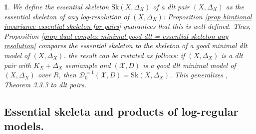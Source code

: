 \documentclass{amsart}%
\numberwithin{equation}{subsection}
\theoremstyle{plain2}
\theoremstyle{definition2}
\theoremstyle{stepstyle}
\theoremstyle{point}
\theoremstyle{subpoint}
\newtheorem{subpoint}[equation]{}%
\newcommand{\spa}[1]{\begin{subpoint}#1\end{subpoint}}           %
\newcommand{\cX}{\ensuremath{\mathscr{X}}}
\newcommand{\Sk}{\mathrm{Sk}}
\begin{document}
\spa{We define the essential skeleton $\Sk(X,\Delta_X)$ of a dlt pair $(X, \Delta_X)$ as the essential skeleton of any log-resolution of $(X,\Delta_X)$: Proposition \ref{prop birational invariance essential skeleton for pairs} guarantees that this is well-defined. Thus, Proposition \ref{prop dual complex minimal good dlt = essential skeleton any resolution} compares the essential skeleton to the skeleton of a good minimal dlt model of $(X,\Delta_X)$. the result can be restated as follows: if $(X,\Delta_X)$ is a dlt pair with $K_X+\Delta_X$ semiample and $(\cX,D)$ is a good dlt minimal model of $(X,\Delta_X)$ over $R$, then $\mathcal{D}_0^{=1}(\cX, D) = \Sk(X,\Delta_X)$. This generalizes \cite{NicaiseXu}, Theorem 3.3.3 to dlt pairs.
}


\subsection{Essential skeleta and products of log-regular models.}
\end{document}
